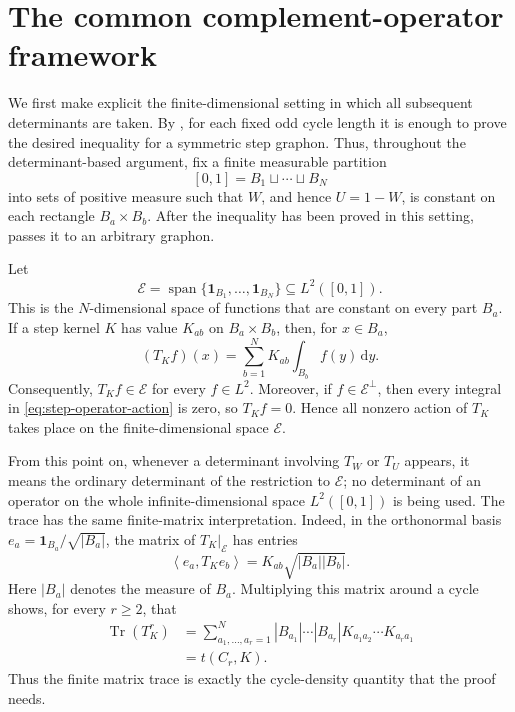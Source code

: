 \documentclass[11pt]{article}
\newcommand{\one}{\mathbf 1}
\newcommand{\ip}[2]{\left\langle #1,#2\right\rangle}
\newcommand{\Tr}{\operatorname{Tr}}
\newcommand{\dd}{\,\mathrm d}
\begin{document}
\section{The common complement-operator framework}\label{sec:common-operator}

We first make explicit the finite-dimensional setting in which all subsequent
determinants are taken.  By , for each fixed odd
cycle length it is enough to prove the desired inequality for a symmetric
step graphon.  Thus, throughout the determinant-based argument, fix a finite
measurable partition
\[
       [0,1]=B_1\sqcup\cdots\sqcup B_N
\]
into sets of positive measure such that \(W\), and hence \(U=1-W\), is
constant on each rectangle \(B_a\times B_b\).  After the inequality has been
proved in this setting,  passes it to an arbitrary
graphon.

Let
\[
       \mathcal E=\operatorname{span}
       \{\one_{B_1},\ldots,\one_{B_N}\}\subseteq L^2([0,1]).
\]
This is the \(N\)-dimensional space of functions that are constant on every
part \(B_a\).  If a step kernel \(K\) has value \(K_{ab}\) on
\(B_a\times B_b\), then, for \(x\in B_a\),
\begin{equation}\label{eq:step-operator-action}
       (T_Kf)(x)=\sum_{b=1}^N K_{ab}\int_{B_b}f(y)\dd y.
\end{equation}
Consequently, \(T_Kf\in\mathcal E\) for every \(f\in L^2\).  Moreover, if
\(f\in\mathcal E^\perp\), then every integral in
\eqref{eq:step-operator-action} is zero, so \(T_Kf=0\).  Hence all nonzero
action of \(T_K\) takes place on the finite-dimensional space
\(\mathcal E\).

From this point on, whenever a determinant involving \(T_W\) or \(T_U\)
appears, it means the ordinary determinant of the restriction to
\(\mathcal E\); no determinant of an operator on the whole infinite-dimensional
space \(L^2([0,1])\) is being used.  The trace has the same finite-matrix
interpretation.  Indeed, in the orthonormal basis
\(e_a=\one_{B_a}/\sqrt{|B_a|}\), the matrix of \(T_K|_{\mathcal E}\) has
entries
\[
       \ip{e_a}{T_Ke_b}=K_{ab}\sqrt{|B_a||B_b|}.
\]
Here \(|B_a|\) denotes the measure of \(B_a\).
Multiplying this matrix around a cycle shows, for every \(r\ge2\), that
\begin{equation}\label{eq:finite-trace-cycle}
\begin{aligned}
 \Tr(T_K^r)
 &=\sum_{a_1,\ldots,a_r=1}^N
   |B_{a_1}|\cdots|B_{a_r}|
   K_{a_1a_2}\cdots K_{a_ra_1}\\
 &=t(C_r,K).
\end{aligned}
\end{equation}
Thus the finite matrix trace is exactly the cycle-density quantity that the
proof needs.
\end{document}
